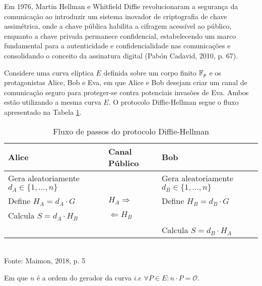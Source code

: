 Em 1976, Martin Hellman e Whitfield Diffie revolucionaram a segurança da
comunicação ao introduzir um sistema inovador de criptografia de chave
assimétrica, onde a chave pública habilita a cifragem acessível ao público,
enquanto a chave privada permanece confidencial, estabelecendo um marco
fundamental para a autenticidade e confidencialidade nas comunicações e
consolidando o conceito da assinatura digital (Pabón Cadavid, 2010, p. 67).

\begin{definicao} \label{definicao:e8d4f010-50a8-42f6-83e1-4fb1e447312d}
	Considere uma curva elíptica $E$ definida sobre um corpo finito $\mathbb{F}_p$ e os
	protagonistas Alice, Bob e Eva, em que Alice e Bob  desejam criar um canal de comunicação seguro para proteger-se contra potenciais invasões de Eva. Ambos estão utilizando a mesma curva $E$. O protocolo Diffie-Hellman segue o fluxo apresentado na Tabela \ref{table:aaf511d5-7922-48dd-b5ad-bf89a728b528}.
	\vspace*{0.4cm}
	\begin{table}[h!]\centering
		\caption{Fluxo de passos do protocolo Diffie-Hellman } \label{table:aaf511d5-7922-48dd-b5ad-bf89a728b528}
		\centering
		\begin{tabular}{|>{\centering\arraybackslash}m{4cm}|>{\centering\arraybackslash}m{4cm}|>{\centering\arraybackslash}m{4cm}|}
			\hline
			\textbf{Alice}                                 & \textbf{Canal Público} & \textbf{Bob}                                   \\
			\hline
			Gera aleatoriamente $d_A \in \{1, \ldots, n\}$ &                        & Gera aleatoriamente $d_B \in \{1, \ldots, n\}$ \\
			\hline
			Define $H_A = d_A \cdot G$                     & $H_A \Rightarrow $     & Define $H_B = d_B \cdot G$                     \\
			\hline
			Calcula $S = d_A \cdot H_B$                    & $\Leftarrow H_B$       &                                                \\
			\hline
			                                               &                        & Calcula $S = d_B \cdot H_A$                    \\
			\hline
		\end{tabular}
		\vspace*{0.4cm}\\ %
		Fonte:  Maimon, 2018,  p. 5
	\end{table}
	\newline Em que $n$ é a ordem do gerador da curva $i.e$ $\forall P \in E:  n \cdot P =  \mathcal{O}$.
\end{definicao}

